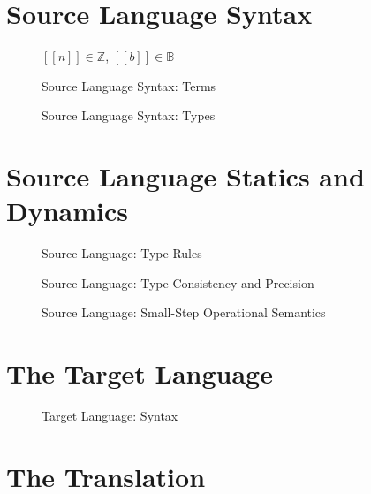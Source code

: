 \documentclass[11pt]{article}
\begin{document}
\section{Source Language Syntax}

\begin{figure}
	$[[n]] \in \mathbb{Z}$, $[[b]]\in\mathbb{B}$

	\caption{Source Language Syntax: Terms}
	\label{fig:term-syntax}
\end{figure}

\begin{figure}


	\caption{Source Language Syntax: Types}
	\label{fig:type-syntax}
\end{figure}

\section{Source Language Statics and Dynamics}

\begin{figure}
	\ottdefnHastype{}
	\caption{Source Language: Type Rules}
	\label{fig:source-typerules}
\end{figure}

\begin{figure}
	\ottdefnConsistent{}
	\ottdefnMeet{}
	\caption{Source Language: Type Consistency and Precision}
	\label{fig:source-precision}
\end{figure}

\begin{figure}
	\ottdefnsSemantics{}
	\caption{Source Language: Small-Step Operational Semantics}
	\label{fig:source-semantics}
\end{figure}

\section{The Target Language}

\begin{figure}
	\caption{Target Language: Syntax}
	\label{fig:target-syntax}
\end{figure}

\section{The Translation}
\end{document}
